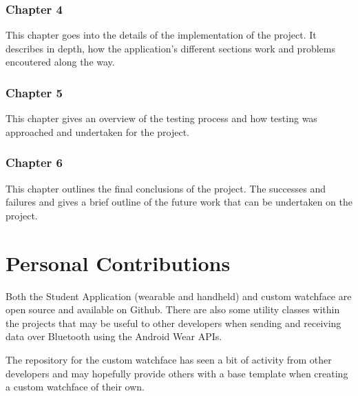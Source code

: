 \subsubsection{Chapter 4}
This chapter goes into the details of the implementation of the project. It
describes in depth, how the application's different sections work and problems
encoutered along the way.

\subsubsection{Chapter 5}
This chapter gives an overview of the testing process and how testing was
approached and undertaken for the project.

\subsubsection{Chapter 6}
This chapter outlines the final conclusions of the project. The successes and
failures and gives a brief outline of the future work that can be undertaken on
the project.

\section{Personal Contributions}

Both the Student Application (wearable and handheld) and custom watchface are
open source and available on Github. There are also some utility classes within
the projects that may be useful to other developers when sending and receiving
data over Bluetooth using the Android Wear APIs.

The repository for the custom watchface has seen a bit of activity from other
developers and may hopefully provide others with a base template when creating
a custom watchface of their own.
